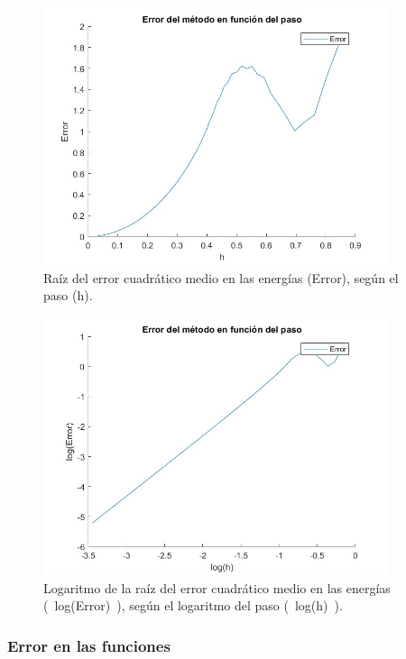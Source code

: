\documentclass[12pt]{article}
\begin{document}
    \begin{figure}[H]
        \centering
        \includegraphics[width=0.9\textwidth]{errorpasoN500.jpg}
        \caption{Raíz del error cuadrático medio en las energías (Error), según el paso (h).}
        \end{figure} 
        
    \begin{figure}[H]
        \centering
        \includegraphics[width=0.9\textwidth]{errorpaso500Nlog.jpg}
        \caption{Logaritmo de la raíz del error cuadrático medio en las energías (~log(Error)~), según el  logaritmo del paso (~log(h)~).}
        \end{figure}

     \subsubsection{Error en las funciones}
\end{document}
